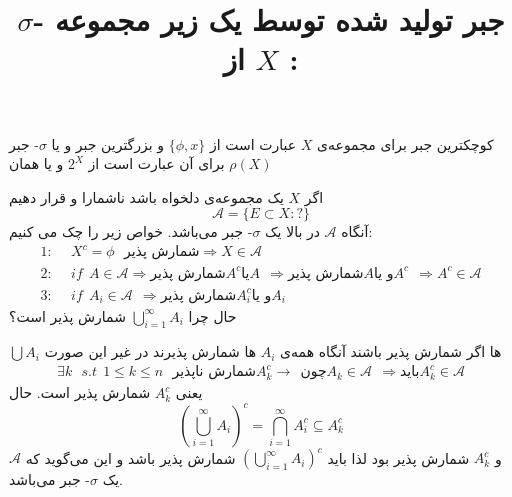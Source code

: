 \begin{example}
کوچکترین جبر برای مجموعه‌ی 
$ X $ 
عبارت است از 
$ \lbrace \phi , x \rbrace $
و بزرگترین جبر و یا
$ \sigma $-
جبر برای آن عبارت است از 
$ 2^X $
و یا همان
$ \rho(X) $
\end{example}
\begin{example}
اگر 
$ X $
یک مجموعه‌ی دلخواه باشد ناشمارا و قرار دهیم 
\begin{equation*}
\mathcal{A} = \lbrace E \subset X : ? \rbrace
\end{equation*}
آنگاه 
$ \mathcal{A} $ 
در بالا یک 
$ \sigma $-
جبر می‌باشد. خواص زیر را چک می کنیم:
\begin{equation*}
\begin{split}
1 : & \ \ X^c = \phi \ \ \ \textit{شمارش پذیر} \Rightarrow X \in \mathcal{A} \\
2 : & \ \ if \ \ A \in \mathcal{A} \Rightarrow \textit{شمارش پذیر} A^c \textit{یا} A \ \ \Rightarrow \textit{شمارش پذیر} A \textit{و یا} A^c \ \ \Rightarrow A^c \in \mathcal{A} \\
3 : & \ \ if \ \ A_i \in \mathcal{A} \ \ \Rightarrow \textit{شمارش پذیر} A_i^c \textit{و یا} A_i 
\end{split}
\end{equation*}
حال چرا 
$ \bigcup^{\infty}_{i = 1} A_i $
شمارش پذیر است؟

$ \bigcup A_i $
ها اگر شمارش پذیر باشند آنگاه همه‌ی 
$ A_i $
ها شمارش پذیرند در غیر این صورت
\begin{equation*}
\begin{split}
\exists k \ \ \ s.t \ \ 1 \leq k \leq n \ \ \ \textit{شمارش ناپذیر} A_k^c  \longrightarrow \ \ \textit{چون} A_k \in \mathcal{A} \ \ \Rightarrow \textit{باید} A^{c}_{k} \in \mathcal{A} 
\end{split}
\end{equation*}
یعنی 
$ A_k^c $
شمارش پذیر است. حال 
\begin{equation*}
{(\bigcup^{\infty}_{i = 1} A_i)}^c =  \bigcap^{\infty}_{i = 1}A_i^c  \subseteq A_k^c
\end{equation*}
و 
$ A_k^c $
شمارش پذیر بود لذا باید 
$ (\bigcup^{\infty}_{i = 1} A_i)^c $
شمارش پذیر باشد و این می‌گوید که 
$ \mathcal{A} $
یک 
$ \sigma $-
جبر می‌باشد. 
\end{example}

\title{
$  \sigma $-
جبر تولید شده توسط یک زیر مجموعه از 
$ X $ :
}

